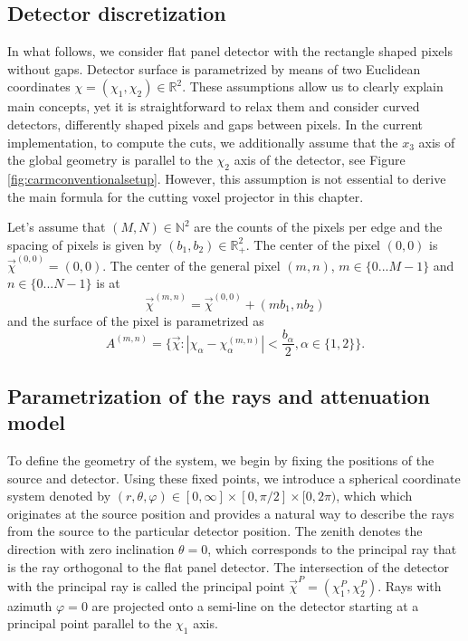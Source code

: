 \subsection{Detector discretization}
In what follows, we consider flat panel detector with the rectangle shaped pixels without gaps. Detector surface is parametrized by means of two Euclidean coordinates $\chi = (\chi_1, \chi_2) \in \mathbb{R}^2$. These assumptions allow us to clearly explain main concepts, yet it is straightforward to relax them and consider curved detectors, differently shaped pixels and gaps between pixels. In the current implementation, to compute the cuts, we additionally assume that the $x_3$ axis of the global geometry is parallel to the $\chi_2$ axis of the detector, see Figure \ref{fig:carmconventionalsetup}. However, this assumption is not essential to derive the main formula for the cutting voxel projector in this chapter.

Let's assume that $(M, N) \in \mathbb{N}^2$ are the counts of the pixels per edge and the spacing of pixels is given by $(b_1,b_2) \in \mathbb{R}_{+}^2$. The center of the pixel $(0,0)$ is $\vec{\chi}^{(0,0)} =  (0, 0)$. The center of the general pixel $(m,n)$,  $m\in \{0...M-1\}$ and $n\in \{0...N-1\}$ is at
\begin{equation}
    \vec{\chi}^{(m,n)} = \vec{\chi}^{(0,0)} +  (m b_1, n b_2)
\end{equation}
and the surface of the pixel is parametrized as
\begin{equation}
A^{(m,n)} = \{ \vec{\chi} : |\chi_\alpha-\chi^{(m,n)}_\alpha| < \frac{b_\alpha}{2}, \alpha \in \{1,2\} \}.
\end{equation}

\subsection{Parametrization of the rays and attenuation model}

To define the geometry of the system, we begin by fixing the positions of the source and detector. Using these fixed points, we introduce a spherical coordinate system denoted by $(r, \theta, \varphi) \in [0,\infty] \times [0,\pi/2] \times [0,2\pi)$, which which originates at the source position and provides a natural way to describe the rays from the source to the particular detector position. The zenith denotes the direction with zero inclination $\theta = 0$, which corresponds to the principal ray that is the ray orthogonal to the flat panel detector. The intersection of the detector with the principal ray is called the principal point $\vec{\chi}^{P} =  (\chi_1^P, \chi_2^P)$. Rays with azimuth $\varphi = 0$ are projected onto a semi-line on the detector starting at a principal point parallel to the $\chi_1$ axis.

